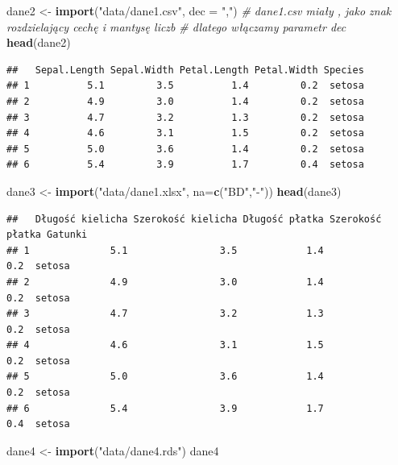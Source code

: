 \documentclass[
]{book}
\newenvironment{Shaded}{\begin{snugshade}}{\end{snugshade}}
\newcommand{\AttributeTok}[1]{\textcolor[rgb]{0.13,0.29,0.53}{#1}}
\newcommand{\CommentTok}[1]{\textcolor[rgb]{0.56,0.35,0.01}{\textit{#1}}}
\newcommand{\FunctionTok}[1]{\textcolor[rgb]{0.13,0.29,0.53}{\textbf{#1}}}
\newcommand{\NormalTok}[1]{#1}
\newcommand{\OtherTok}[1]{\textcolor[rgb]{0.56,0.35,0.01}{#1}}
\newcommand{\StringTok}[1]{\textcolor[rgb]{0.31,0.60,0.02}{#1}}
\theoremstyle{plain}
\theoremstyle{definition}
\theoremstyle{definition}
\theoremstyle{definition}
\theoremstyle{definition}
\theoremstyle{definition}
\theoremstyle{remark}
\begin{document}
\begin{Shaded}
\begin{Highlighting}[]
\NormalTok{dane2 }\OtherTok{\textless{}{-}} \FunctionTok{import}\NormalTok{(}\StringTok{"data/dane1.csv"}\NormalTok{, }\AttributeTok{dec =} \StringTok{","}\NormalTok{)}
\CommentTok{\# dane1.csv miały , jako znak rozdzielający cechę i mantysę liczb}
\CommentTok{\# dlatego włączamy parametr dec}
\FunctionTok{head}\NormalTok{(dane2)}
\end{Highlighting}
\end{Shaded}

\begin{verbatim}
##   Sepal.Length Sepal.Width Petal.Length Petal.Width Species
## 1          5.1         3.5          1.4         0.2  setosa
## 2          4.9         3.0          1.4         0.2  setosa
## 3          4.7         3.2          1.3         0.2  setosa
## 4          4.6         3.1          1.5         0.2  setosa
## 5          5.0         3.6          1.4         0.2  setosa
## 6          5.4         3.9          1.7         0.4  setosa
\end{verbatim}

\begin{Shaded}
\begin{Highlighting}[]
\NormalTok{dane3 }\OtherTok{\textless{}{-}} \FunctionTok{import}\NormalTok{(}\StringTok{"data/dane1.xlsx"}\NormalTok{, }\AttributeTok{na=}\FunctionTok{c}\NormalTok{(}\StringTok{"BD"}\NormalTok{,}\StringTok{"{-}"}\NormalTok{))}
\FunctionTok{head}\NormalTok{(dane3)}
\end{Highlighting}
\end{Shaded}

\begin{verbatim}
##   Długość kielicha Szerokość kielicha Długość płatka Szerokość płatka Gatunki
## 1              5.1                3.5            1.4              0.2  setosa
## 2              4.9                3.0            1.4              0.2  setosa
## 3              4.7                3.2            1.3              0.2  setosa
## 4              4.6                3.1            1.5              0.2  setosa
## 5              5.0                3.6            1.4              0.2  setosa
## 6              5.4                3.9            1.7              0.4  setosa
\end{verbatim}

\begin{Shaded}
\begin{Highlighting}[]
\NormalTok{dane4 }\OtherTok{\textless{}{-}} \FunctionTok{import}\NormalTok{(}\StringTok{"data/dane4.rds"}\NormalTok{)}
\NormalTok{dane4}
\end{Highlighting}
\end{Shaded}
\end{document}
